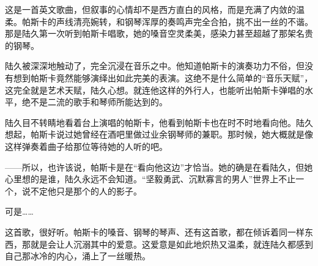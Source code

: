
这是一首英文歌曲，但叙事的心情却不是西方直白的风格，而是充满了内敛的温柔。帕斯卡的声线清亮婉转，和钢琴浑厚的奏鸣声完全合拍，挑不出一丝的不谐。那是陆久第一次听到帕斯卡唱歌，她的嗓音空灵柔美，感染力甚至超越了那架名贵的钢琴。

陆久被深深地触动了，完全沉浸在音乐之中。他知道帕斯卡的演奏功力不俗，但没有想到帕斯卡竟然能够演绎出如此完美的表演。这绝不是什么简单的“音乐天赋”，这完全就是艺术天赋，陆久心想。就连他这样的外行人，也能听出帕斯卡弹唱的水平，绝不是二流的歌手和琴师所能达到的。

陆久目不转睛地看着台上演唱的帕斯卡，他看到帕斯卡也在时不时地看向他。陆久想起，帕斯卡说过她曾经在酒吧里做过业余钢琴师的兼职。那时候，她大概就是像这样弹奏着曲子给那位等待她的人听的吧。

——所以，也许该说，帕斯卡是在“看向他这边”才恰当。她的确是在看陆久，但她心里想的是谁，陆久永远不会知道。“坚毅勇武、沉默寡言的男人”世界上不止一个，说不定他只是那个的人的影子。

可是……

这首歌，很好听。帕斯卡的嗓音、钢琴的琴声、还有这首歌，都在倾诉着同一样东西，那就是会让人沉溺其中的爱意。这爱意是如此地炽热又温柔，就连陆久都感到自己那冰冷的内心，涌上了一丝暖热。

